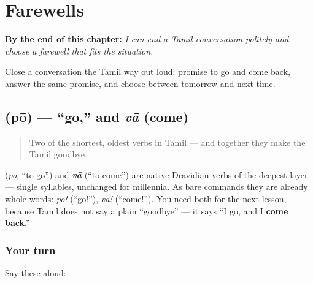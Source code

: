 
\chapter{Farewells}
\label{ch:farewells}

\begin{chapteropening}
\textbf{By the end of this chapter:} \emph{I can end a Tamil conversation politely and choose a farewell that fits the situation.}

Close a conversation the Tamil way out loud: promise to go and come back, answer the same promise, and choose between tomorrow and next-time.
\end{chapteropening}

\section[\texorpdfstring{\ta{போ} (pō)}{போ (pō)}]{ (pō) — \textquotedblleft{}go,\textquotedblright{} and \emph{vā} (come)}

\label{lesson:TA-C04-po}



\begin{quote}
Two of the shortest, oldest verbs in Tamil — and together they make the Tamil goodbye.
\end{quote}

\begin{cousinweb}
\textbf{} (\emph{pō}, \textquotedblleft{}to go\textquotedblright{}) and \emph{\textbf{vā}} (\textquotedblleft{}to come\textquotedblright{}) are native Dravidian verbs of the deepest layer — single syllables, unchanged for millennia. As bare commands they are already whole words: \emph{pō!} (\textquotedblleft{}go!\textquotedblright{}), \emph{vā!} (\textquotedblleft{}come!\textquotedblright{}). You need both for the next lesson, because Tamil does not say a plain \textquotedblleft{}goodbye\textquotedblright{} — it says \textquotedblleft{}I go, and I \textbf{come back}.\textquotedblright{}
\end{cousinweb}

\subsection*{Your turn}
Say these aloud:


